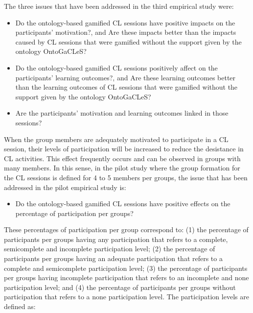 The three issues that have been addressed in the third empirical study were:

\begin{itemize}
\item Do the ontology-based gamified CL sessions have positive impacts on the participants' motivation?, and Are these impacts better than the impacts caused by CL sessions that were gamified without the support given by the ontology OntoGaCLeS?
\item Do the ontology-based gamified CL sessions positively affect on the participants' learning outcomes?, and Are these learning outcomes better than the learning outcomes of CL sessions that were gamified without the support given by the ontology OntoGaCLeS?
\item Are the participants' motivation and learning outcomes linked in those sessions?
\end{itemize}

When the group members are adequately motivated to participate in a CL session, their levels of participation will be increased to reduce the desistance in CL activities. This effect frequently occurs and can be observed in groups with many members. In this sense, in the pilot study where the group formation for the CL sessions is defined for 4 to 5 members per groups, the issue that has been addressed in the pilot empirical study is:

\begin{itemize}
\item Do the ontology-based gamified CL sessions have positive effects on the percentage of participation per groups?
\end{itemize}

These percentages of participation per group correspond to: (1) the percentage of participants per groups having any participation that refers to a complete, semicomplete and incomplete participation level; (2) the percentage of participants per groups having an adequate participation that refers to a complete and semicomplete participation level; (3) the percentage of participants per groups having incomplete participation that refers to an incomplete and none participation level; and (4) the percentage of participants per groups without participation that refers to a none participation level. The participation levels are defined as:

